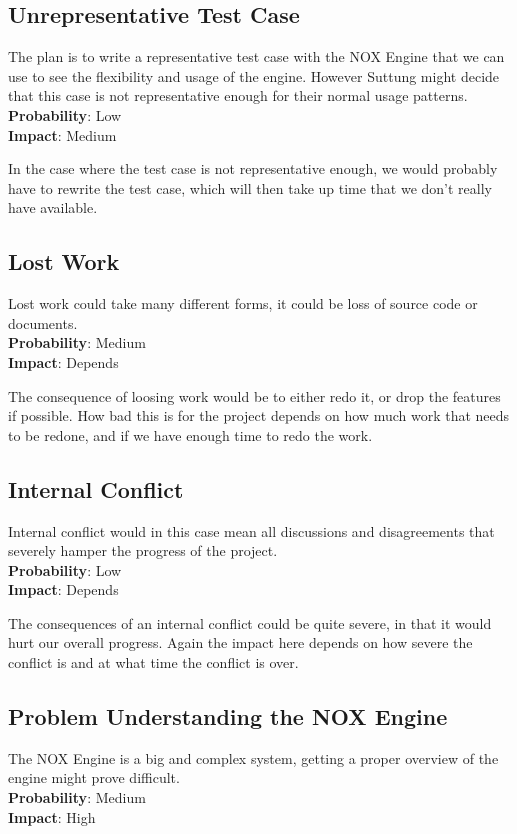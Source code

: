 \subsection*{Unrepresentative Test Case}
The plan is to write a representative test case with the NOX Engine that we can use
to see the flexibility and usage of the engine. However Suttung might decide that this
case is not representative enough for their normal usage patterns.\\
\textbf{Probability}: Low\\
\textbf{Impact}: Medium

In the case where the test case is not representative enough, we would probably have to
rewrite the test case, which will then take up time that we don't really have available.

\subsection*{Lost Work}
Lost work could take many different forms, it could be loss of source code or documents.\\
\textbf{Probability}: Medium\\
\textbf{Impact}: Depends

The consequence of loosing work would be to either redo it, or drop the features if possible.
How bad this is for the project depends on how much work that needs to be redone, and
if we have enough time to redo the work.

\subsection*{Internal Conflict}
Internal conflict would in this case mean all discussions and disagreements that severely
hamper the progress of the project.\\
\textbf{Probability}: Low\\
\textbf{Impact}: Depends

The consequences of an internal conflict could be quite severe, in that it would hurt
our overall progress. Again the impact here depends on how severe the conflict is
and at what time the conflict is over.

\subsection*{Problem Understanding the NOX Engine}
The NOX Engine is a big and complex system, getting a proper overview of the engine
might prove difficult.\\
\textbf{Probability}: Medium\\
\textbf{Impact}: High

